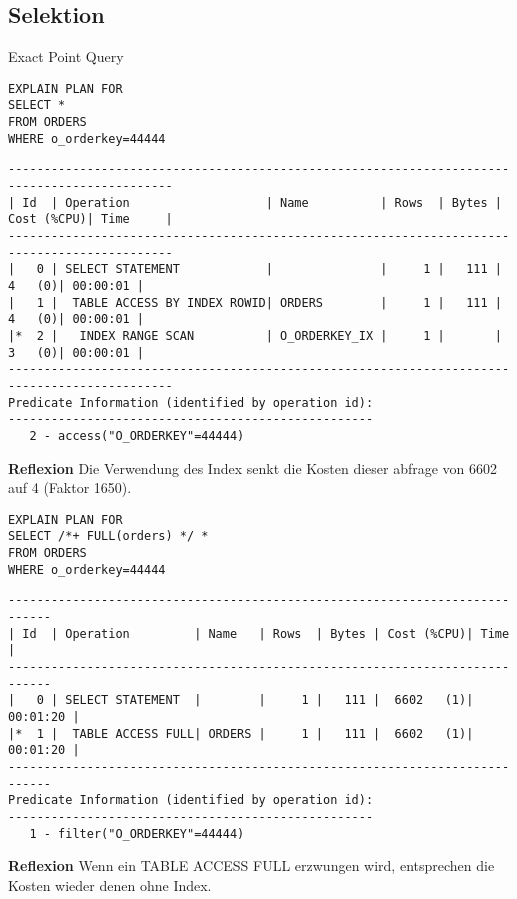 \documentclass[10pt]{article}
\begin{document}
\subsection{Selektion}
Exact Point Query
\begin{lstlisting}[style=sql]
EXPLAIN PLAN FOR
SELECT *
FROM ORDERS
WHERE o_orderkey=44444
\end{lstlisting}
\begin{lstlisting}[style=queryexecutionplan]
---------------------------------------------------------------------------------------------
| Id  | Operation                   | Name          | Rows  | Bytes | Cost (%CPU)| Time     |
---------------------------------------------------------------------------------------------
|   0 | SELECT STATEMENT            |               |     1 |   111 |     4   (0)| 00:00:01 |
|   1 |  TABLE ACCESS BY INDEX ROWID| ORDERS        |     1 |   111 |     4   (0)| 00:00:01 |
|*  2 |   INDEX RANGE SCAN          | O_ORDERKEY_IX |     1 |       |     3   (0)| 00:00:01 |
---------------------------------------------------------------------------------------------
Predicate Information (identified by operation id):
---------------------------------------------------
   2 - access("O_ORDERKEY"=44444)
\end{lstlisting}

\textbf{Reflexion} \newline
Die Verwendung des Index senkt die Kosten dieser abfrage von 6602 auf 4 (Faktor 1650).

\begin{lstlisting}[style=sql]
EXPLAIN PLAN FOR
SELECT /*+ FULL(orders) */ *
FROM ORDERS
WHERE o_orderkey=44444
\end{lstlisting}
\begin{lstlisting}[style=queryexecutionplan]
----------------------------------------------------------------------------
| Id  | Operation         | Name   | Rows  | Bytes | Cost (%CPU)| Time     |
----------------------------------------------------------------------------
|   0 | SELECT STATEMENT  |        |     1 |   111 |  6602   (1)| 00:01:20 |
|*  1 |  TABLE ACCESS FULL| ORDERS |     1 |   111 |  6602   (1)| 00:01:20 |
----------------------------------------------------------------------------
Predicate Information (identified by operation id):
---------------------------------------------------
   1 - filter("O_ORDERKEY"=44444)
\end{lstlisting}
\textbf{Reflexion} \newline
Wenn ein TABLE ACCESS FULL erzwungen wird, entsprechen die Kosten wieder denen ohne Index.
\end{document}

